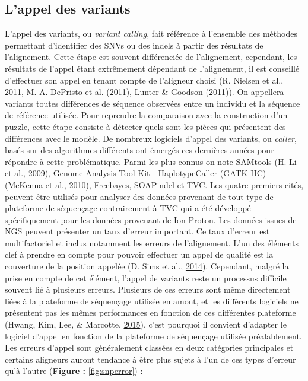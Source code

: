 \documentclass[12pt,twoside]{reedthesis}
\theoremstyle{definition}
\theoremstyle{definition}
\theoremstyle{remark}
\begin{document}
  \subsection{L'appel des variants}\label{lappel-des-variants}
  
  L'appel des variants, ou \emph{variant calling}, fait référence à
  l'ensemble des méthodes permettant d'identifier des SNVs ou des indels à
  partir des résultats de l'alignement. Cette étape est souvent
  différenciée de l'alignement, cependant, les résultats de l'appel étant
  extrêmement dépendant de l'alignement, il est conseillé d'effectuer son
  appel en tenant compte de l'aligneur choisi (R. Nielsen et al.,
  \protect\hyperlink{ref-Nielsen2011}{2011}, M. A. DePristo et al.
  (\protect\hyperlink{ref-DePristo2011}{2011}), Lunter \& Goodson
  (\protect\hyperlink{ref-Lunter2011}{2011})). On appellera variants
  toutes différences de séquence observées entre un individu et la
  séquence de référence utilisée. Pour reprendre la comparaison avec la
  construction d'un puzzle, cette étape consiste à détecter quels sont les
  pièces qui présentent des différences avec le modèle. De nombreux
  logiciels d'appel des variants, ou \emph{caller}, basés sur des
  algorithmes différents ont émergés ces dernières années pour répondre à
  cette problématique. Parmi les plus connus on note SAMtools (H. Li et
  al., \protect\hyperlink{ref-Li2009}{2009}), Genome Analysis Tool Kit -
  HaplotypeCaller (GATK-HC) (McKenna et al.,
  \protect\hyperlink{ref-McKenna2010}{2010}), Freebayes, SOAPindel et TVC.
  Les quatre premiers cités, peuvent être utilisés pour analyser des
  données provenant de tout type de plateforme de séquençage contrairement
  à TVC qui a été développé spécifiquement pour les données provenant de
  Ion Proton. Les données issues de NGS peuvent présenter un taux d'erreur
  important. Ce taux d'erreur est multifactoriel et inclus notamment les
  erreurs de l'alignement. L'un des éléments clef à prendre en compte pour
  pouvoir effectuer un appel de qualité est la couverture de la position
  appelée (D. Sims et al., \protect\hyperlink{ref-Sims2014}{2014}).
  Cependant, malgré la prise en compte de cet élément, l'appel de variants
  reste un processus difficile souvent lié à plusieurs erreurs. Plusieurs
  de ces erreurs sont même directement liées à la plateforme de séquençage
  utilisée en amont, et les différents logiciels ne présentent pas les
  mêmes performances en fonction de ces différentes plateforme (Hwang,
  Kim, Lee, \& Marcotte, \protect\hyperlink{ref-Hwang2015}{2015}), c'est
  pourquoi il convient d'adapter le logiciel d'appel en fonction de la
  plateforme de séquençage utilisée préalablement. Les erreurs d'appel
  sont généralement classées en deux catégories principales et certains
  aligneurs auront tendance à être plus sujets à l'un de ces types
  d'erreur qu'à l'autre (\textbf{Figure : }\ref{fig:snperror}) :
  
\end{document}
